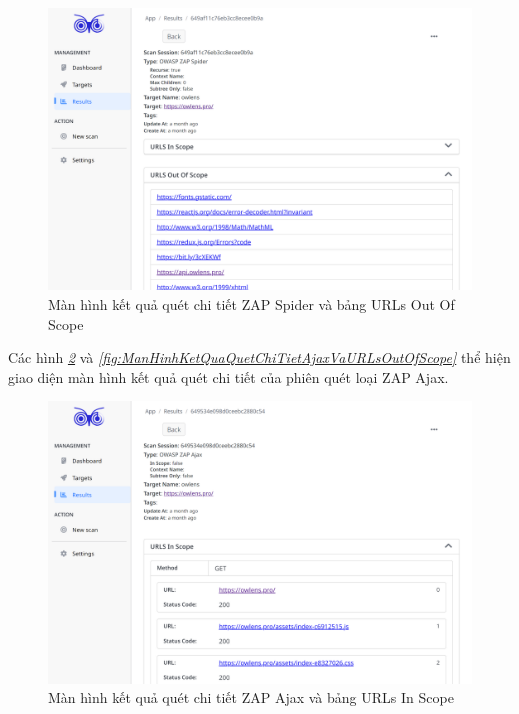 \begin{figure}[H]
      \centering
      \includegraphics[width=\textwidth]{applied-thesis-chapters/chapter-6/Màn hình kết quả quét chi tiết ZAP Spider và bảng URLs Out Of Scope.png}
      \caption{Màn hình kết quả quét chi tiết ZAP Spider và bảng URLs Out Of Scope}
      \label{fig:ManHinhKetQuaQuetChiTietSpiderVaURLsOutOfScope}
\end{figure}

Các hình \textit{\ref{fig:ManHinhKetQuaQuetChiTietAjaxVaURLsInScope} } 
và \textit{\ref{fig:ManHinhKetQuaQuetChiTietAjaxVaURLsOutOfScope} } 
thể hiện giao diện màn hình kết quả quét chi tiết của phiên quét loại ZAP Ajax.

\begin{figure}[H]
      \centering
      \includegraphics[width=\textwidth]{applied-thesis-chapters/chapter-6/Màn hình kết quả quét chi tiết ZAP Ajax và bảng URLs In Scope.png}
      \caption{Màn hình kết quả quét chi tiết ZAP Ajax và bảng URLs In Scope}
      \label{fig:ManHinhKetQuaQuetChiTietAjaxVaURLsInScope}
\end{figure}

